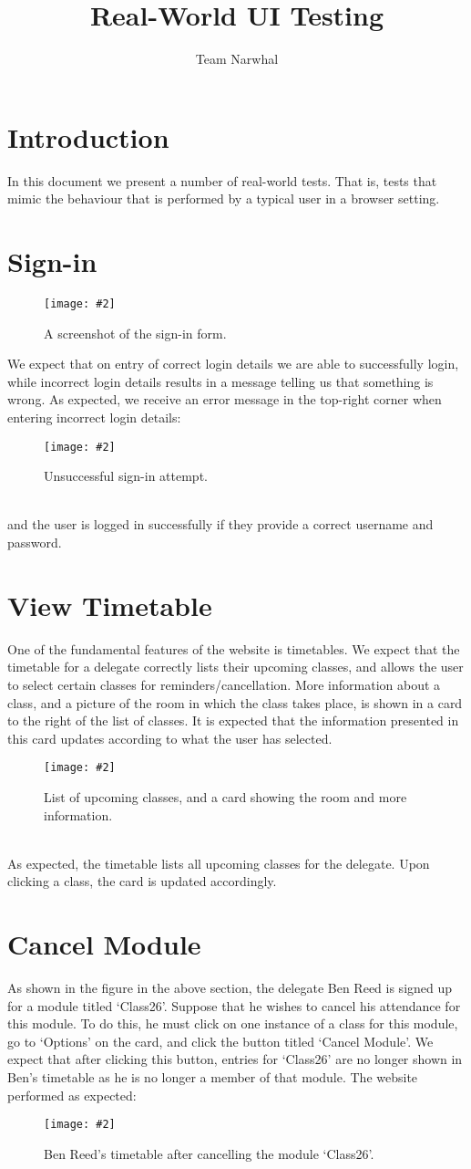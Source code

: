\documentclass{article}
\title{Real-World UI Testing}
\author{Team Narwhal}
\date{}
\newcommand{\screen}[3]{
    \begin{figure}[h]
    \centering
    \texttt{[image: \#2]}
    \caption{#3}
    \end{figure}
}
\begin{document}
\maketitle

\section{Introduction}
In this document we present a number of real-world tests.
That is, tests that mimic the behaviour that is performed by a typical user in a browser setting.

\section{Sign-in}
\screen{0.8}{sign-in-form}{A screenshot of the sign-in form.}
We expect that on entry of correct login details we are able to successfully login, while incorrect login details results in a message telling us that something is wrong.
As expected, we receive an error message in the top-right corner when entering incorrect login details:
\screen{0.8}{sign-in-fail}{Unsuccessful sign-in attempt.}\\
and the user is logged in successfully if they provide a correct username and password.

\section{View Timetable}
One of the fundamental features of the website is timetables.
We expect that the timetable for a delegate correctly lists their upcoming classes, and allows the user to select certain classes for reminders/cancellation.
More information about a class, and a picture of the room in which the class takes place, is shown in a card to the right of the list of classes.
It is expected that the information presented in this card updates according to what the user has selected.
\screen{1}{timetable}{List of upcoming classes, and a card showing the room and more information.}\\
As expected, the timetable lists all upcoming classes for the delegate.
Upon clicking a class, the card is updated accordingly.

\section{Cancel Module}
As shown in the figure in the above section, the delegate Ben Reed is signed up for a module titled `Class26'.
Suppose that he wishes to cancel his attendance for this module.
To do this, he must click on one instance of a class for this module, go to `Options' on the card, and click the button titled `Cancel Module'.
We expect that after clicking this button, entries for `Class26' are no longer shown in Ben's timetable as he is no longer a member of that module.
The website performed as expected:
\screen{1}{timetable-removed}{Ben Reed's timetable after cancelling the module `Class26'.}
\end{document}

